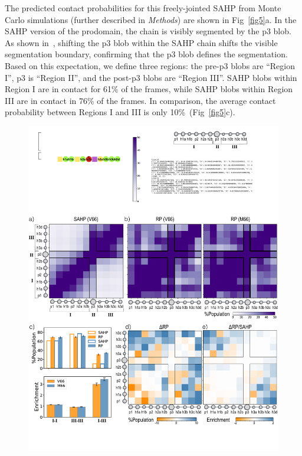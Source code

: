 \documentclass[10pt,letterpaper]{article}
\begin{document}
The predicted contact probabilities for this freely-jointed SAHP from Monte Carlo simulations (further described in {\it Methods}) are shown in Fig~\ref{fig5}a. In the SAHP version of the prodomain, the chain is visibly segmented by the p3 blob. As shown in~, shifting the p3 blob within the SAHP chain shifts the visible segmentation boundary, confirming that the p3 blob defines the segmentation. Based on this expectation, we define three regions: the pre-p3 blobs are ``Region I'', p3 is ``Region II'', and the post-p3 blobs are ``Region III''. SAHP blobs within Region I are in contact for 61\% of the frames, while SAHP blobs within Region III are in contact in 76\% of the frames. In comparison, the average contact probability between Regions I and III is only 10\%~(Fig~\ref{fig5}c).

\begin{figure}[!ht]
\includegraphics[scale=0.3,width=\textwidth,trim={0 0cm 0 0cm},clip]{./figures/fig5.pdf}

\end{figure}
\end{document}
